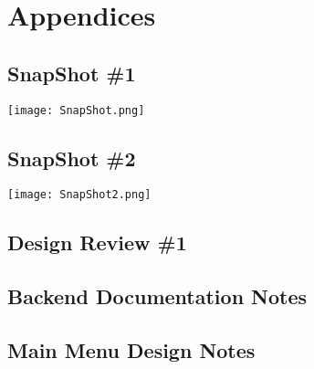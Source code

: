 \documentclass{scrreprt}
\begin{document}
\chapter{Appendices}
\pagebreak
    
\section{SnapShot \#1}

\texttt{[image: SnapShot.png]}\\

\section {SnapShot \#2}

\texttt{[image: SnapShot2.png]}\\

\section{Design Review \#1}
\section{Backend Documentation Notes}
\section{Main Menu Design Notes}
\end{document}
